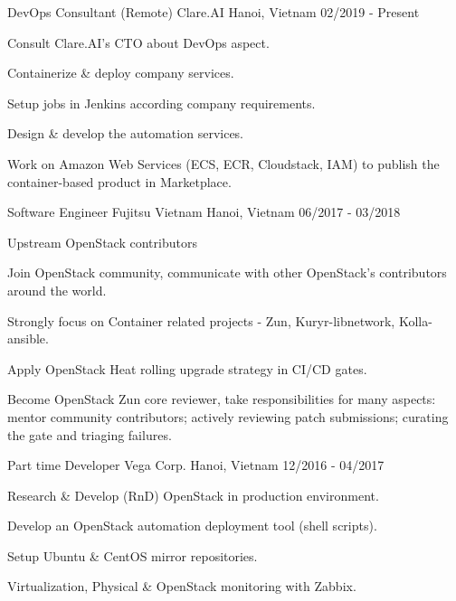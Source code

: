 \begin{cventries}
  \cventry
    {DevOps Consultant (Remote)} %
    {Clare.AI} %
    {Hanoi, Vietnam} %
    {02/2019 - Present} %
    {
      \begin{cvitems} %
        \item {Consult Clare.AI's CTO about DevOps aspect.}
        \item {Containerize \& deploy company services.}
        \item {Setup jobs in Jenkins according company requirements.}
        \item {Design \& develop the automation services.}
        \item {Work on Amazon Web Services (ECS, ECR, Cloudstack, IAM) to publish the container-based product in Marketplace.}
      \end{cvitems}
    }

  \cventry
    {Software Engineer} %
    {Fujitsu Vietnam} %
    {Hanoi, Vietnam} %
    {06/2017 - 03/2018} %
    {
      \begin{cvitems} %
      	\item {Upstream OpenStack contributors}
      	\item {Join OpenStack community, communicate with other OpenStack's contributors around the world.}
        \item {Strongly focus on Container related projects - Zun, Kuryr-libnetwork, Kolla-ansible.}
        \item {Apply OpenStack Heat rolling upgrade strategy in CI/CD gates.}
        \item {Become OpenStack Zun core reviewer, take responsibilities for many aspects: mentor community contributors; actively reviewing patch submissions; curating the gate and triaging failures.}
      \end{cvitems}
    }

  \cventry
    {Part time Developer} %
    {Vega Corp.} %
    {Hanoi, Vietnam} %
    {12/2016 - 04/2017} %
    {
      \begin{cvitems} %
        \item {Research \& Develop (RnD) OpenStack in production environment.}
        \item {Develop an OpenStack automation deployment tool (shell scripts).}
        \item {Setup Ubuntu \& CentOS mirror repositories.}
        \item {Virtualization, Physical \& OpenStack monitoring with Zabbix.}
      \end{cvitems}
    }


\end{cventries}

